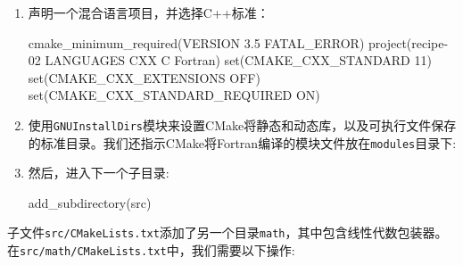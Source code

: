 \begin{enumerate}
\item 声明一个混合语言项目，并选择C++标准：

\begin{codebox}[cmake]
cmake_minimum_required(VERSION 3.5 FATAL_ERROR)
project(recipe-02 LANGUAGES CXX C Fortran)
set(CMAKE_CXX_STANDARD 11)
set(CMAKE_CXX_EXTENSIONS OFF)
set(CMAKE_CXX_STANDARD_REQUIRED ON)
\end{codebox}

\item 使用\texttt{GNUInstallDirs}模块来设置CMake将静态和动态库，以及可执行文件保存的标准目录。我们还指示CMake将Fortran编译的模块文件放在\texttt{modules}目录下:


\item 然后，进入下一个子目录:

\begin{codebox}[cmake]
add_subdirectory(src)
\end{codebox}

\end{enumerate}

子文件\texttt{src/CMakeLists.txt}添加了另一个目录\texttt{math}，其中包含线性代数包装器。在\texttt{src/math/CMakeLists.txt}中，我们需要以下操作:


